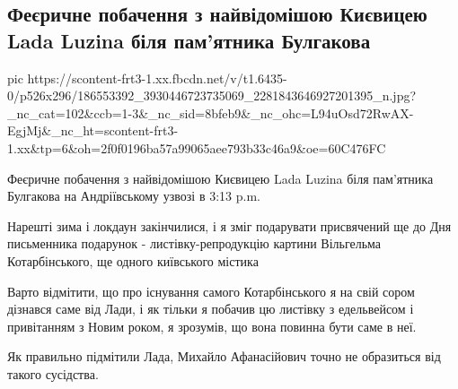  
 
 
 
 

\subsection{Феєричне побачення з найвідомішою Києвицею Lada Luzina біля пам'ятника Булгакова}


\ifcmt
  pic https://scontent-frt3-1.xx.fbcdn.net/v/t1.6435-0/p526x296/186553392_3930446723735069_2281843646927201395_n.jpg?_nc_cat=102&ccb=1-3&_nc_sid=8bfeb9&_nc_ohc=L94uOsd72RwAX-EgjMj&_nc_ht=scontent-frt3-1.xx&tp=6&oh=2f0f0196ba57a99065aee793b33c46a9&oe=60C476FC
\fi

Феєричне побачення з найвідомішою Києвицею Lada Luzina біля пам'ятника
Булгакова на Андріївському узвозі в 3:13 p.m.

Нарешті зима і локдаун закінчилися, і я зміг подарувати присвячений ще до Дня
письменника подарунок - листівку-репродукцію картини Вільгельма Котарбінського,
ще одного київського містика 

Варто  відмітити, що про існування самого Котарбінського я на свій сором
дізнався саме від Лади, і як тільки я побачив цю листівку з едельвейсом і
привітанням з Новим роком, я зрозумів, що вона повинна бути саме в неї.

Як правильно підмітили Лада, Михайло Афанасійович точно не образиться від
такого сусідства.
